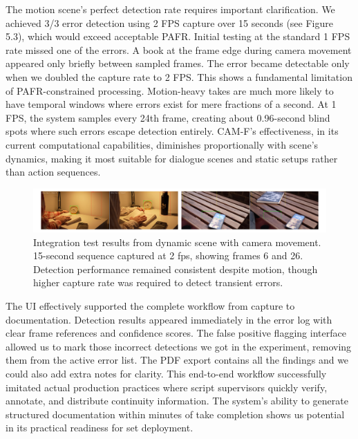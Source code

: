The motion scene's perfect detection rate requires important clarification. We achieved 3/3 error detection using 2 FPS capture over 15 seconds (see Figure 5.3), which would exceed acceptable PAFR. Initial testing at the standard 1 FPS rate missed one of the errors. A book at the frame edge during camera movement appeared only briefly between sampled frames. The error became detectable only when we doubled the capture rate to 2 FPS. This shows a fundamental limitation of PAFR-constrained processing. Motion-heavy takes are much more likely to have temporal windows where errors exist for mere fractions of a second. At 1 FPS, the system samples every 24th frame, creating about 0.96-second blind spots where such errors escape detection entirely. CAM-F's effectiveness, in its current computational capabilities, diminishes proportionally with scene's dynamics, making it most suitable for dialogue scenes and static setups rather than action sequences.

\begin{figure}[h]
\centering
\includegraphics[width=\textwidth]{figures/motiontest.png}
\caption{Integration test results from dynamic scene with camera movement. 15-second sequence captured at 2 fps, showing frames 6 and 26. Detection performance remained consistent despite motion, though higher capture rate was required to detect transient errors.}
\label{fig:dynamic-shots}
\end{figure}

The UI effectively supported the complete workflow from capture to documentation. Detection results appeared immediately in the error log with clear frame references and confidence scores. The false positive flagging interface allowed us to mark those incorrect detections we got in the experiment, removing them from the active error list. The PDF export contains all the findings and we could also add extra notes for clarity. This end-to-end workflow successfully imitated actual production practices where script supervisors quickly verify, annotate, and distribute continuity information. The system's ability to generate structured documentation within minutes of take completion shows us potential in its practical readiness for set deployment.

